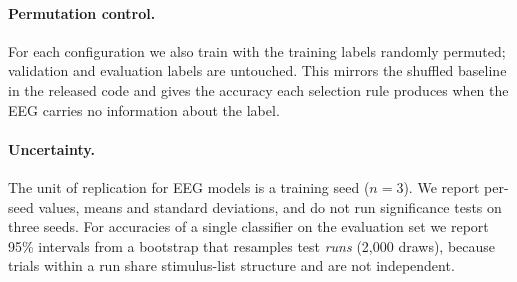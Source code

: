 \paragraph{Permutation control.}
For each configuration we also train with the training labels randomly permuted; validation and
evaluation labels are untouched. This mirrors the shuffled baseline in the released code and gives
the accuracy each selection rule produces when the EEG carries no information about the label.

\paragraph{Uncertainty.}
The unit of replication for EEG models is a training seed ($n=3$). We report per-seed values, means
and standard deviations, and do not run significance tests on three seeds. For accuracies of a single
classifier on the evaluation set we report 95\% intervals from a bootstrap that resamples test
\emph{runs} (2{,}000 draws), because trials within a run share stimulus-list structure and are not
independent.
